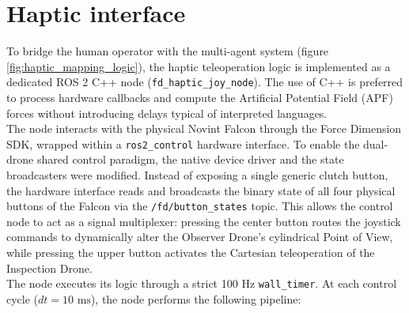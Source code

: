 \section{Haptic interface}
To bridge the human operator with the multi-agent system (figure \ref{fig:haptic_mapping_logic}), the haptic teleoperation logic is implemented as a dedicated ROS 2 C++ node (\texttt{fd\_haptic\_joy\_node}). The use of C++ is preferred to process hardware callbacks and compute the Artificial Potential Field (APF) forces without introducing delays typical of interpreted languages.
\\The node interacts with the physical Novint Falcon through the Force Dimension SDK, wrapped within a \texttt{ros2\_control} hardware interface. To enable the dual-drone shared control paradigm, the native device driver and the state broadcasters were modified. Instead of exposing a single generic clutch button, the hardware interface reads and broadcasts the binary state of all four physical buttons of the Falcon via the \texttt{/fd/button\_states} topic. This allows the control node to act as a signal multiplexer: pressing the center button routes the joystick commands to dynamically alter the Observer Drone's cylindrical Point of View, while pressing the upper button activates the Cartesian teleoperation of the Inspection Drone.
\\The node executes its logic through a strict 100 Hz \texttt{wall\_timer}. At each control cycle ($dt = 10\text{ ms}$), the node performs the following pipeline:
